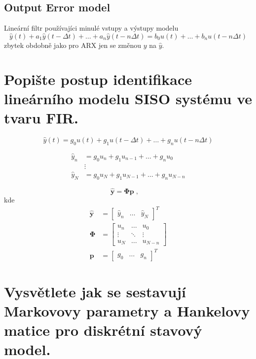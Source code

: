 \documentclass{article}
\begin{document}
	\subsection{Output Error model}
	Lineární filtr používajíci minulé vstupy a výstupy modelu
	\begin{equation}
		\hat{y}(t) + a_1 \hat{y}(t-\Delta t) + \ldots + a_n \hat{y}(t-n\Delta t)
		=
		b_0 u(t) + \ldots + b_n u(t-n\Delta t)
	\end{equation}
	zbytek obdobně jako pro ARX jen se změnou $y$ na $\hat{y}$.


	\section{Popište postup identifikace lineárního modelu SISO systému ve tvaru FIR. }

	\begin{equation}
		\hat{y}(t) = g_0 u(t) + g_1 u(t-\Delta t) + \dots + g_n u(t-n\Delta t)
	\end{equation}

	\begin{align}
		\hat{y}_n &= g_0 u_n + g_1 u_{n-1} + \dots + g_n u_0 \\
		&\vdots \\
		\hat{y}_N &= g_0 u_{N} + g_1 u_{N-1} + \dots + g_n u_{N-n}
	\end{align}

	\begin{equation}
		\bm{\hat{y}} = \bm{\Phi} \bm{p}
		\;,\quad 
	\end{equation}
	kde
	\begin{align*}
		\bm{\hat{y}} &= \begin{bmatrix} \hat{y}_n & \dots & \hat{y}_N \end{bmatrix}^T
		\\ 
		\bm{\Phi}
		&=
		\begin{bmatrix}
			u_n & \dots & u_0 \\
			\vdots & \ddots & \vdots \\
			u_N & \dots & u_{N-n} 
		\end{bmatrix}
		\\ 
		\bm{p} &= \begin{bmatrix} g_0 & \dots & g_n \end{bmatrix}^T
	\end{align*}

	\section{Vysvětlete jak se sestavují Markovovy parametry a Hankelovy matice pro diskrétní stavový model. }
\end{document}
